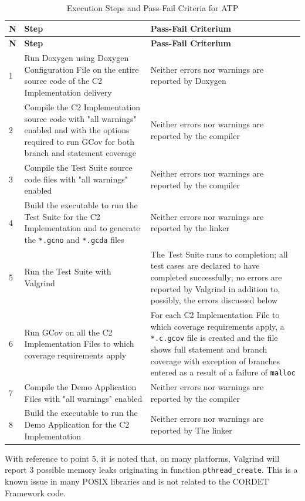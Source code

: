 \documentclass[a4paper,10pt]{article}
\begin{document}
\begin{longtable}{|l|p{5.2cm}|p{5.2cm}|}
\caption{Execution Steps and Pass-Fail Criteria for ATP}\label{tab:atp} \\
\hline
\rowcolor{light-gray}
\textbf{N} & \textbf{Step} & \textbf{Pass-Fail Criterium} \\
\hline\hline
\endfirsthead
\rowcolor{light-gray}
\textbf{N} & \textbf{Step} & \textbf{Pass-Fail Criterium} \\
\hline\hline
\endhead

1 & Run Doxygen using Doxygen Configuration File on the entire source code of the C2 Implementation delivery &
Neither errors nor warnings are reported by Doxygen \\
\hline
2 & Compile the C2 Implementation source code with "all warnings" enabled and with the options required to run GCov for both branch and statement coverage &
Neither errors nor warnings are reported by the compiler \\
\hline
3 & Compile the Test Suite source code files with "all warnings" enabled &
Neither errors nor warnings are reported by the compiler \\
\hline
4 & Build the executable to run the Test Suite for the C2 Implementation and to generate the \texttt{*.gcno} and \texttt{*.gcda} files &
Neither errors nor warnings are reported by the linker \\
\hline
5 & Run the Test Suite with Valgrind &
The Test Suite runs to completion; all test cases are declared to have completed successfully; no errors are reported by Valgrind in addition to, possibly, the errors discussed below \\
\hline
6 & Run GCov on all the C2 Implementation Files to which coverage requirements apply &
For each C2 Implementation File to which coverage requirements apply, a \texttt{*.c.gcov}
file is created and the file shows full statement and branch coverage with exception of
branches entered as a result of a failure of \texttt{malloc} \\
\hline
7 & Compile the Demo Application Files with "all warnings" enabled &
Neither errors nor warnings are reported by the compiler \\
\hline
8 & Build the executable to run the Demo Application for the C2 Implementation &
Neither errors nor warnings are reported by The linker \\
\hline
\end{longtable}

With reference to point 5, it is noted that, on many platforms, Valgrind will report 3 possible memory leaks originating in function \texttt{pthread\_create}. This is a known issue in many POSIX libraries and is not related to the CORDET Framework code.
\end{document}
